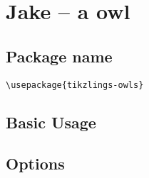 \documentclass[parskip=half]{scrartcl}
\begin{document}
\begin{tcblisting}{}
\marmot[3D]
\end{tcblisting}


\clearpage
\section{Jake -- a owl}

\subsection{Package name}

\begin{tcolorbox}
\vspace*{0.5cm}
\lstinline|\usepackage{tikzlings-owls}|
\vspace*{0.5cm}
\end{tcolorbox}

\subsection{Basic Usage}

\begin{tcblisting}{}
\owl
\end{tcblisting}

\subsection{Options}

\begin{tcblisting}{}
\owl[body=SteelBlue]
\end{tcblisting}

\begin{tcblisting}{}
\owl[eye=red]
\end{tcblisting}

\begin{tcblisting}{}
\owl[pupil=red]
\end{tcblisting}

\begin{tcblisting}{}
\owl[bill=red]
\end{tcblisting}

\begin{tcblisting}{}
\owl[feet=red]
\end{tcblisting}

\begin{tcblisting}{}
\owl[3D]
\end{tcblisting}
\end{document}
